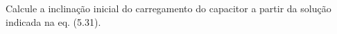 Calcule a inclinação inicial do carregamento do capacitor a partir da solução indicada na eq. (5.31).

